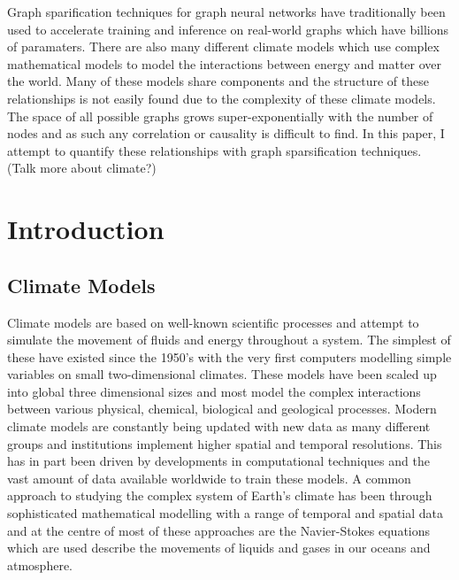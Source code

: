 \documentclass[honours,12pt]{unswthesis}
\newcommand\blankpage{%
    \null
    \thispagestyle{empty}%
    \addtocounter{page}{-1}%
    \newpage}
\numberwithin{equation}{section}
\begin{document}

\afterpage{\blankpage}



Graph sparification techniques for graph neural networks have traditionally been used to 
accelerate training and inference on real-world graphs which have billions of paramaters.
There are also many different climate models which use complex mathematical models to model 
the interactions between energy and matter over the world. Many of these models share 
components and the structure of these relationships is not easily found due to the complexity of
these climate models. The space of all possible graphs grows super-exponentially with the number 
of nodes and as such any correlation or causality is difficult to find. In this paper, I attempt 
to quantify these relationships with graph sparsification techniques.
(Talk more about climate?)
\afterpage{\blankpage}


\afterpreface

%
%

\afterpage{\blankpage}

\chapter{Introduction}\label{s-intro}

{\section{Climate Models}}\label{climate-introduction}

{\noindent}Climate models are based on well-known scientific processes and attempt to simulate the movement of fluids and energy throughout a system. 
The simplest of these have existed since the 1950's with the very first computers modelling simple variables on small two-dimensional climates\cite{edwards2011history}.
These models have been scaled up into global three dimensional sizes and most model the complex interactions between various physical, chemical, biological and geological processes. 
Modern climate models are constantly being updated with new data as many different groups and institutions implement higher spatial and temporal resolutions.
This has in part been driven by developments in computational techniques and the vast amount of data available worldwide to train these models.\cite{Overpeck2011}
A common approach to studying the complex system of Earth's climate has been through sophisticated mathematical modelling with a range of temporal and spatial data\cite{Kulinich_2022}
and at the centre of most of these approaches are the Navier-Stokes equations which are used describe the movements of liquids and gases in our oceans and atmosphere.\cite{Palmer2008} \\
\end{document}
